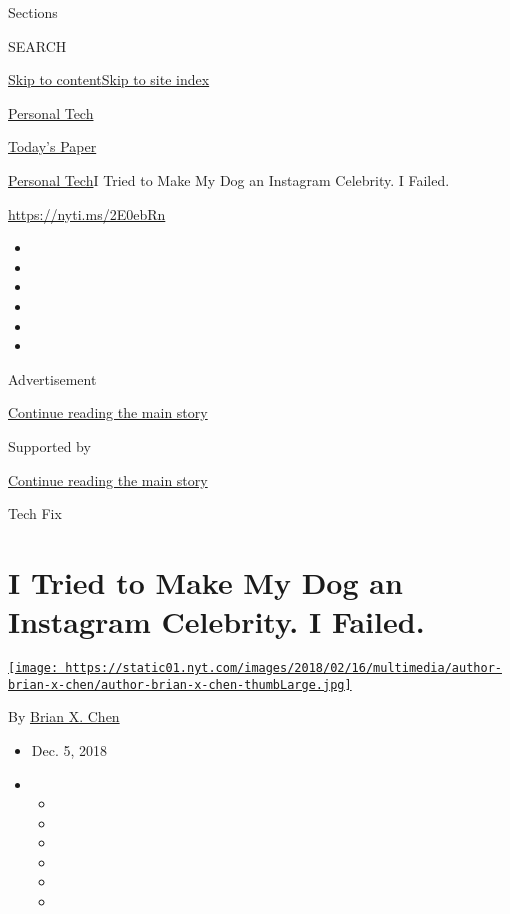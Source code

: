 Sections

SEARCH

\protect\hyperlink{site-content}{Skip to
content}\protect\hyperlink{site-index}{Skip to site index}

\href{https://www.nytimes.com/section/technology/personaltech}{Personal
Tech}

\href{https://myaccount.nytimes.com/auth/login?response_type=cookie\&client_id=vi}{}

\href{https://www.nytimes.com/section/todayspaper}{Today's Paper}

\href{/section/technology/personaltech}{Personal Tech}\textbar{}I Tried
to Make My Dog an Instagram Celebrity. I Failed.

\url{https://nyti.ms/2E0ebRn}

\begin{itemize}
\item
\item
\item
\item
\item
\item
\end{itemize}

Advertisement

\protect\hyperlink{after-top}{Continue reading the main story}

Supported by

\protect\hyperlink{after-sponsor}{Continue reading the main story}

Tech Fix

\hypertarget{i-tried-to-make-my-dog-an-instagram-celebrity-i-failed}{%
\section{I Tried to Make My Dog an Instagram Celebrity. I
Failed.}\label{i-tried-to-make-my-dog-an-instagram-celebrity-i-failed}}

\href{https://www.nytimes.com/by/brian-x-chen}{\texttt{[image: https://static01.nyt.com/images/2018/02/16/multimedia/author-brian-x-chen/author-brian-x-chen-thumbLarge.jpg]}}

By \href{https://www.nytimes.com/by/brian-x-chen}{Brian X. Chen}

\begin{itemize}
\item
  Dec. 5, 2018
\item
  \begin{itemize}
  \item
  \item
  \item
  \item
  \item
  \item
  \end{itemize}
\end{itemize}

